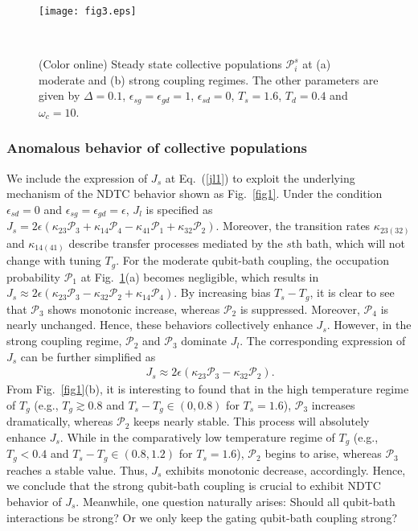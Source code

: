 \documentclass[twocolumn,preprintnumbers,amsmath,amssymb]{revtex4}
\begin{document}
\begin{figure}[tbp]
\texttt{[image: fig3.eps]}
\caption{(Color online) Steady state collective populations $\mathcal{P}^s_i$ at (a) moderate and (b) strong coupling regimes.
The other parameters are given by $\Delta=0.1$, $\epsilon_{sg}=\epsilon_{gd}=1$, $\epsilon_{sd}=0$, $T_s=1.6$, $T_d=0.4$ and $\omega_c=10$.
}~\label{fig3}
\end{figure}

\subsubsection{Anomalous behavior of collective populations}

We include the expression of $J_s$ at Eq.~(\ref{jl1}) to exploit the underlying mechanism of the NDTC behavior shown as Fig.~\ref{fig1}.
Under the condition $\epsilon_{sd}=0$ and $\epsilon_{sg}=\epsilon_{gd}=\epsilon$, $J_l$ is specified as
$J_s=2\epsilon(\kappa_{23}\mathcal{P}_3+\kappa_{14}\mathcal{P}_4-\kappa_{41}\mathcal{P}_1+\kappa_{32}\mathcal{P}_2)$.
Moreover, the transition rates $\kappa_{23(32)}$ and $\kappa_{14(41)}$ describe transfer processes mediated by  the $s$th bath,
which will not change with tuning $T_g$.
For  the moderate qubit-bath coupling, the occupation probability $\mathcal{P}_1$ at Fig.~\ref{fig3}(a) becomes negligible,
which results in $J_s{\approx}2\epsilon(\kappa_{23}\mathcal{P}_3-\kappa_{32}\mathcal{P}_2+\kappa_{14}\mathcal{P}_4)$.
By increasing bias $T_s-T_g$, it is clear to see that $\mathcal{P}_3$ shows monotonic increase, whereas $\mathcal{P}_2$ is suppressed.
Moreover, $\mathcal{P}_4$ is nearly unchanged. Hence, these behaviors collectively enhance $J_s$.
However, in the strong coupling regime, $\mathcal{P}_2$ and $\mathcal{P}_3$ dominate $J_l$.
The corresponding expression of $J_s$ can  be further simplified as
\begin{eqnarray}~\label{jls1}
{J}_s{\approx}2\epsilon(\kappa_{23}\mathcal{P}_3-\kappa_{32}\mathcal{P}_2).
\end{eqnarray}
From Fig.~\ref{fig1}(b), it is interesting to found that in the high temperature regime of $T_g$ (e.g., $T_g{\gtrsim}0.8$ and $T_s-T_g\in (0, 0.8)$ for $T_s=1.6$),
$\mathcal{P}_3$ increases dramatically, whereas $\mathcal{P}_2$ keeps nearly stable.
This process will absolutely enhance $J_s$.
While in the comparatively low temperature regime of $T_g$ (e.g., $T_g<0.4$ and $T_s-T_g\in (0.8, 1.2)$ for $T_s=1.6$), $\mathcal{P}_2$ begins to arise,
whereas $\mathcal{P}_3$ reaches a stable value.
Thus, $J_s$ exhibits monotonic decrease, accordingly.
Hence, we conclude that the strong qubit-bath coupling is crucial to exhibit NDTC behavior of $J_s$.
Meanwhile, one question naturally arises: Should all qubit-bath interactions be strong? Or we only keep the gating qubit-bath coupling strong?
\end{document}
